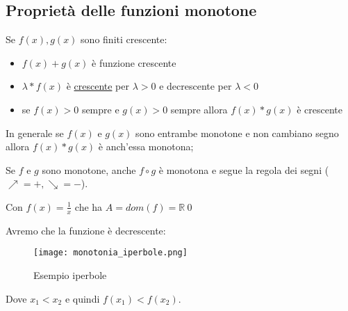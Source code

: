 \documentclass[../main.tex, class=article, 12pt]{subfiles}
\begin{document}
\subsection{Proprietà delle funzioni monotone}\label{sec:}

Se $ f(x),g(x) $ sono finiti crescente:
\begin{itemize}
        \item $ f(x) + g(x) $ è funzione crescente 
        \item $\lambda * f(x)  $ è \underline{crescente} per \underline{$ \lambda > 0 $} e decrescente per \underline{$ \lambda < 0 $}
        \item se $ f(x)>0 $ sempre e $ g(x)>0 $ sempre allora $ f(x)*g(x) $ è crescente
\end{itemize}

\begin{tcolorbox}
\begin{oss}
        In generale se $ f(x) $ e $ g(x) $ sono entrambe monotone e non cambiano segno allora $ f(x)*g(x) $ è anch'essa monotona;
\end{oss}
\end{tcolorbox}

Se $ f $ e $ g $ sono monotone, anche $ f \circ g $ è monotona e segue la regola dei segni ($\nearrow =+, \searrow=- $).


\begin{exmp}
Con $ f(x) = \frac{1}{x} $ che ha $ A = dom(f) = \mathbb{R} \ {0} $ 

Avremo che la funzione è decrescente:
\begin{figure}[H]
  	\texttt{[image: monotonia\_iperbole.png]}
  	\caption{Esempio iperbole}
        \label{fig:monotonia_iperbole}
\end{figure}
Dove $ x_1 < x_2 $ e quindi $ f(x_1) < f(x_2) $.

\end{exmp}
\end{document}
